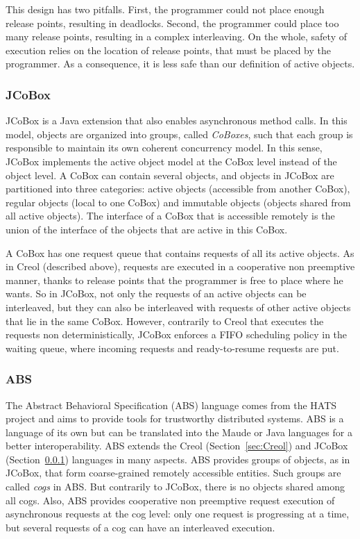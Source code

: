 \documentclass[11pt]{report}
\begin{document}
This design has two pitfalls. First, the programmer could not place enough release points, resulting in deadlocks. Second, the programmer could place too many release points, resulting in a complex interleaving. On the whole, safety of execution relies on the location of release points, that must be placed by the programmer. As a consequence, it is less safe than our definition of active objects.


\subsubsection{JCoBox}\label{sec:JCoBox}
JCoBox \cite{ref:jcobox} is a Java extension that also enables asynchronous method calls. In this model, objects are organized into groups, called \emph{CoBoxes}, such that each group is responsible to maintain its own coherent concurrency model. In this sense, JCoBox implements the active object model at the CoBox level instead of the object level. A CoBox can contain several objects, and objects in JCoBox are partitioned into three categories: active objects (accessible from another CoBox), regular objects (local to one CoBox) and immutable objects (objects shared from all active objects). 
The interface of a CoBox that is accessible remotely is the union of the interface of the objects that are active in this CoBox. 

A CoBox has one request queue that contains requests of all its active objects. As in Creol (described above), requests are executed in a cooperative non preemptive manner, thanks to release points that the programmer is free to place where he wants.
So in JCoBox, not only the requests of an active objects can be interleaved, but they can also be interleaved with requests of other active objects that lie in the same CoBox. 
However, contrarily to Creol that executes the requests non deterministically, JCoBox enforces a FIFO scheduling policy in the waiting queue, where incoming requests and ready-to-resume requests are put. 


\subsubsection{ABS}\label{sec:ABS}
The Abstract Behavioral Specification (ABS) language \cite{ref:abs} comes from the HATS \cite{ref:hats} project and aims to provide tools for trustworthy distributed systems. ABS is a language of its own but can be translated into the Maude or Java languages for a better interoperability.
ABS extends the Creol (Section~\ref{sec:Creol}) and JCoBox (Section~\ref{sec:JCoBox}) languages in many aspects. ABS provides groups of objects, as in JCoBox, that form coarse-grained remotely accessible entities. Such groups are called \emph{cogs} in ABS. But contrarily to JCoBox, there is no objects shared among all cogs. Also, ABS provides cooperative non preemptive request execution of asynchronous requests at the cog level: only one request is progressing at a time, but several requests of a cog can have an interleaved execution. 
\end{document}

